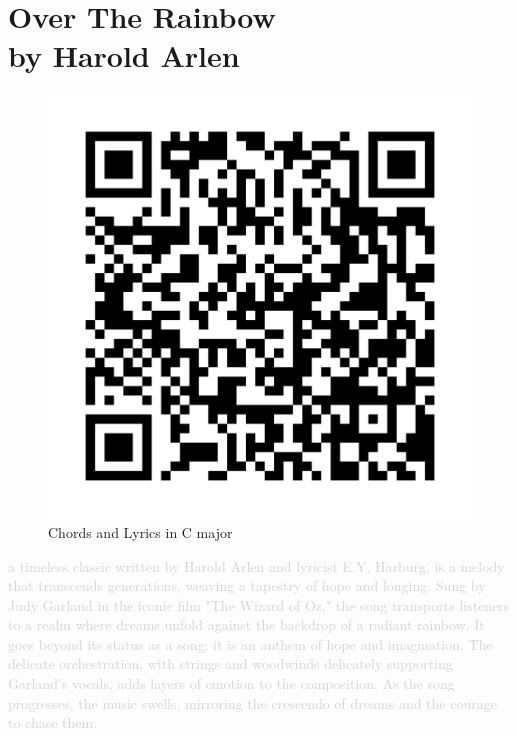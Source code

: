 \chapter[Over The Rainbow]{Over The Rainbow\\[1ex]\large{by Harold Arlen}}

\begin{figure}
\includegraphics[width=1\linewidth]{QR_Codes/QR_OverTheRainbow_Chords.png}\\
Chords and Lyrics in C major
\end{figure}

\textcolor{lightgray}{a timeless classic written by Harold Arlen and lyricist E.Y. Harburg, is a melody that transcends generations, weaving a tapestry of hope and longing. Sung by Judy Garland in the iconic film "The Wizard of Oz," the song transports listeners to a realm where dreams unfold against the backdrop of a radiant rainbow.
It goes beyond its status as a song; it is an anthem of hope and imagination. The delicate orchestration, with strings and woodwinds delicately supporting Garland's vocals, adds layers of emotion to the composition. As the song progresses, the music swells, mirroring the crescendo of dreams and the courage to chase them.}\\
